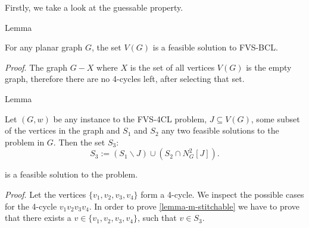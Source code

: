 \noindent Firstly, we take a look at the guessable property.

\begin{mydefinition}{Lemma}
    \label{lemma-guessable}

    \noindent For any planar graph $G$, the set $V(G)$ is a feasible solution to FVS-BCL.

\end{mydefinition}

\noindent \textit{Proof}. The graph $G - X$ where $X$ is the set of all vertices $V(G)$ is the empty graph, 
therefore there are no 4-cycles left, after selecting that set.

\begin{mydefinition}{Lemma}
    \label{lemma-m-stitchable}

    \noindent Let $(G, w)$ be any instance to the FVS-4CL problem, $J \subseteq V(G)$, some subset
    of the vertices in the graph 
    and $S_1$ and $S_2$ any two feasible solutions to the problem in $G$. Then the set $S_3$:
    \[S_3 := (S_1 \backslash J) \cup (S_2 \cap N^{2}_{G} \left[J\right]).\]
    
    is a feasible solution to the problem.


\end{mydefinition}

\noindent \textit{Proof}.
Let the vertices $\{v_1,v_2,v_3,v_4\}$ form a 4-cycle.
We inspect the possible cases for the 4-cycle $v_1 v_2 v_3 v_4$. In order 
to prove \ref{lemma-m-stitchable} we have to prove that there exists a $v \in \{v_1, v_2, v_3, v_4\}$,
such that $v \in S_3$. 

